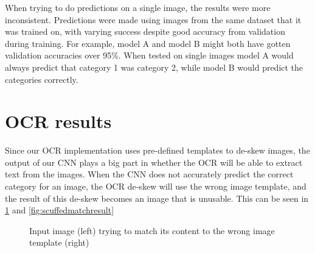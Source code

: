 When trying to do predictions on a single image, the results were more inconsistent.
Predictions were made using images from the same dataset that it was trained on, with varying success despite good accuracy from validation during training.
For example, model A and model B might both have gotten validation accuracies over 95\%.
When tested on single images model A would always predict that category 1 was category 2, while model B would predict the categories correctly.

\section{OCR results}
Since our OCR implementation uses pre-defined templates to de-skew images, the output of our CNN plays a big part in whether the OCR will be able to extract text from the images.
When the CNN does not accurately predict the correct category for an image, the OCR de-skew will use the wrong image template, and the result of this de-skew becomes an image that is unusable.
This can be seen in \ref{fig:scuffedmatch2} and \ref{fig:scuffedmatchresult}

\begin{figure}[h]
    \caption{Input image (left) trying to match its content to the wrong image template (right)}
    \label{fig:scuffedmatch2}
\end{figure}

